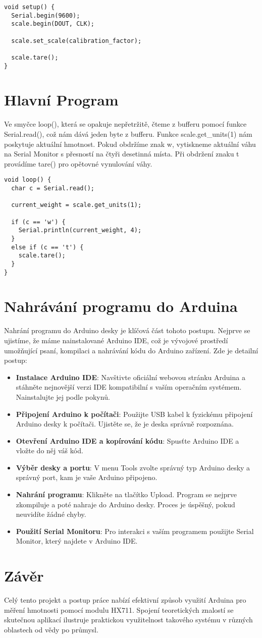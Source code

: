 \begin{lstlisting}
void setup() {
  Serial.begin(9600);
  scale.begin(DOUT, CLK);

  scale.set_scale(calibration_factor);

  scale.tare();
}
\end{lstlisting}

\section*{Hlavní Program}
Ve smyčce loop(), která se opakuje nepřetržitě, čteme z bufferu pomocí funkce Serial.read(), což nám dává jeden byte z bufferu.
Funkce scale.get\_units(1) nám poskytuje aktuální hmotnost.
Pokud obdržíme znak w, vytiskneme aktuální váhu na Serial Monitor s přesností na čtyři desetinná místa.
Při obdržení znaku t provádíme tare() pro opětovné vynulování váhy.

\begin{lstlisting}
void loop() {
  char c = Serial.read();

  current_weight = scale.get_units(1);

  if (c == 'w') {
    Serial.println(current_weight, 4);
  }
  else if (c == 't') {
    scale.tare();
  }
}
\end{lstlisting}

\section*{Nahrávání programu do Arduina}
Nahrání programu do Arduino desky je klíčová část tohoto postupu.
Nejprve se ujistíme, že máme nainstalované Arduino IDE, což je vývojové prostředí umožňující psaní, kompilaci a nahrávání kódu do Arduino zařízení.
Zde je detailní postup:

\begin{itemize}
  \item \textbf{Instalace Arduino IDE}: Navštivte oficiální webovou stránku Arduina a stáhněte nejnovější verzi IDE kompatibilní s vaším operačním systémem.
  Nainstalujte jej podle pokynů.
  \item \textbf{Připojení Arduino k počítači}: Použijte USB kabel k fyzickému připojení Arduino desky k počítači.
  Ujistěte se, že je deska správně rozpoznána.
  \item \textbf{Otevření Arduino IDE a kopírování kódu}: Spusťte Arduino IDE a vložte do něj váš kód.
  \item \textbf{Výběr desky a portu}: V menu Tools zvolte správný typ Arduino desky a správný port, kam je vaše Arduino připojeno.
  \item \textbf{Nahrání programu}: Klikněte na tlačítko Upload.
  Program se nejprve zkompiluje a poté nahraje do Arduino desky.
  Proces je úspěšný, pokud neuvidíte žádné chyby.
  \item \textbf{Použití Serial Monitoru}: Pro interakci s vaším programem použijte Serial Monitor, který najdete v Arduino IDE.
\end{itemize}

\section*{Závěr}
Celý tento projekt a postup práce nabízí efektivní způsob využití Arduina pro měření hmotnosti pomocí modulu HX711.
Spojení teoretických znalostí se skutečnou aplikací ilustruje praktickou využitelnost takového systému v různých oblastech od vědy po průmysl.


